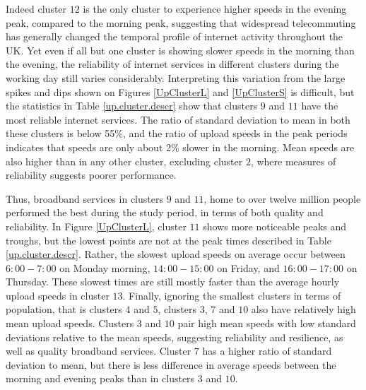 \documentclass[Royal,times,sageh]{sagej}
\begin{document}
Indeed cluster \(12\) is the only cluster to experience higher speeds in
the evening peak, compared to the morning peak, suggesting that
widespread telecommuting has generally changed the temporal profile of
internet activity throughout the UK. Yet even if all but one cluster is
showing slower speeds in the morning than the evening, the reliability
of internet services in different clusters during the working day still
varies considerably. Interpreting this variation from the large spikes
and dips shown on Figures \ref{UpClusterL} and \ref{UpClusterS} is
difficult, but the statistics in Table \ref{up.cluster.descr} show that
clusters \(9\) and \(11\) have the most reliable internet services. The
ratio of standard deviation to mean in both these clusters is below
55\%, and the ratio of upload speeds in the peak periods indicates that
speeds are only about 2\% slower in the morning. Mean speeds are also
higher than in any other cluster, excluding cluster \(2\), where
measures of reliability suggests poorer performance.

Thus, broadband services in clusters \(9\) and \(11\), home to over
twelve million people performed the best during the study period, in
terms of both quality and reliability. In Figure \ref{UpClusterL},
cluster \(11\) shows more noticeable peaks and troughs, but the lowest
points are not at the peak times described in Table
\ref{up.cluster.descr}. Rather, the slowest upload speeds on average
occur between \(6:00-7:00\) on Monday morning, \(14:00-15:00\) on
Friday, and \(16:00-17:00\) on Thursday. These slowest times are still
mostly faster than the average hourly upload speeds in cluster \(13\).
Finally, ignoring the smallest clusters in terms of population, that is
clusters \(4\) and \(5\), clusters \(3\), \(7\) and \(10\) also have
relatively high mean upload speeds. Clusters \(3\) and \(10\) pair high
mean speeds with low standard deviations relative to the mean speeds,
suggesting reliability and resilience, as well as quality broadband
services. Cluster \(7\) has a higher ratio of standard deviation to
mean, but there is less difference in average speeds between the morning
and evening peaks than in clusters \(3\) and \(10\).
\end{document}
